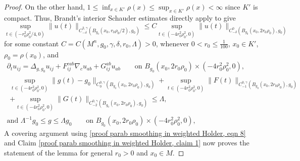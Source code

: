 \documentclass[12pt]{amsart}
\renewcommand{\1}{{\mathbf 1}}
\theoremstyle{others}
\newtheorem{rmk}[thm]{Remark}
\numberwithin{equation}{section}
\begin{document}
\begin{proof}
    On the other hand,  $1 \le \inf_{x \in K'} \rho(x) \le \sup_{x \in K'} \rho(x) < \infty$ since $K'$ is compact.
    Thus, Brandt's interior Schauder estimates \cite{Brandt69} directly apply to give 
    \begin{equation} \label{proof parab smoothing in weighted Holder, eqn 8}
        \sup_{t \in (-r_0^2 \rho_0^2 /4, 0)} \| u( t) \|_{C^{2, \gamma}_{-\delta}( B_{g_0}(x_0, r_0 \rho_0/2) , g_0) } 
        \le C \sup_{t \in (-4r_0^2 \rho_0^2, 0)} \| u(t) \|_{C^0_{-\delta}( B_{g_0}(x_0, 2 r_0 \rho_0) , g_0 ) } 
    \end{equation}
    for some constant $C = C(M^n, g_0, \gamma, \delta, r_0, \Lambda)>0$, whenever $0 < r_0 \le \frac1{100}$, $x_0 \in K'$, $\rho_0 = \rho(x_0)$, and 
    \begin{gather*}
        \partial_t u_{ij} = \Delta_{g, g_0} u_{ij} + F_{ij}^{cab} \nabla_c u_{ab} + G_{ij}^{ab} u_{ab} \qquad \text{on } B_{g_0}(x_0, 2r_0 \rho_0 ) \times (-4r_0^2\rho_0^2, 0), \\
        \begin{split}
            \sup_{t \in (-4r_0^2\rho_0^2 , 0)} \|  g ( t) - g_0\|_{C^{0, \gamma}_{0}( B_{g_0}( x_0, 2 r_0 \rho_0), g_0 ) }+ \sup_{t \in (-4r_0^2\rho_0^2 , 0)} \|  F ( t)\|_{C^{0, \gamma}_{-1}( B_{g_0}( x_0, 2 r_0 \rho_0) , g_0) } \\+ \sup_{t \in (-4r_0^2\rho_0^2, 0)} \|  G( t) \|_{C^{0, \gamma}_{-2}( B_{g_0}( x_0, 2 r_0 \rho_0) , g_0 ) } 
            \le \Lambda,
        \end{split} \\
        \label{lem parab smoothing in weighted Holder, eqn 3}
        \text{and } \Lambda^{-1} g_0 \le g \le \Lambda g_0 \qquad \text{on } B_{g_0}(x_0, 2r_0 \rho_0 ) \times (-4r_0^2\rho_0^2, 0) ,
    \end{gather*}
    A covering argument using \eqref{proof parab smoothing in weighted Holder, eqn 8} and Claim \ref{proof parab smoothing in weighted Holder, claim 1} now proves the statement of the lemma for general $r_0 > 0$ and $x_0 \in M$.
\end{proof}

\end{document}

